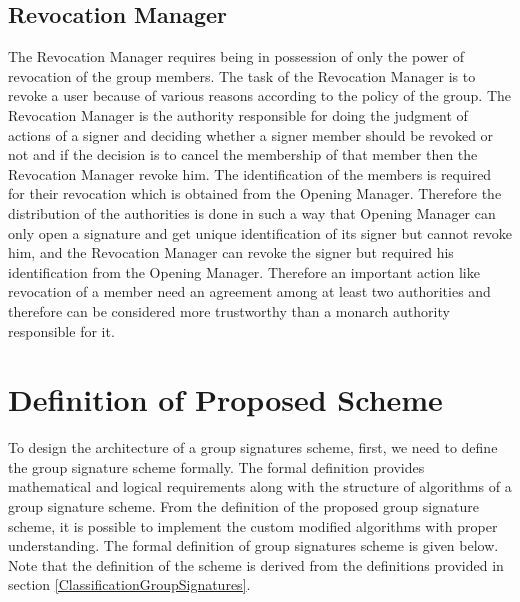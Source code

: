 \subsection{Revocation Manager}
The Revocation Manager requires being in possession of only the power of revocation of the group members. The task of the Revocation Manager is to revoke a user because of various reasons according to the policy of the group. The Revocation Manager is the authority responsible for doing the judgment of actions of a signer and deciding whether a signer member should be revoked or not and if the decision is to cancel the membership of that member then the Revocation Manager revoke him.  The identification of the members is required for their revocation which is obtained from the Opening Manager. Therefore the distribution of the authorities is done in such a way that Opening Manager can only open a signature and get unique identification of its signer but cannot revoke him, and the Revocation Manager can revoke the signer but required his identification from the Opening Manager. Therefore an important action like revocation of a member need an agreement among at least two authorities and therefore can be considered more trustworthy than a monarch authority responsible for it. 

\section{Definition of Proposed Scheme}\label{pro:definition}
To design the architecture of a group signatures scheme, first, we need to define the group signature scheme formally. The formal definition provides mathematical and logical requirements along with the structure of algorithms of a group signature scheme. From the definition of the proposed group signature scheme, it is possible to implement the custom modified algorithms with proper understanding. The formal definition of group signatures scheme is given below. Note that the definition of the scheme is derived from the definitions provided in section \ref{ClassificationGroupSignatures}.

